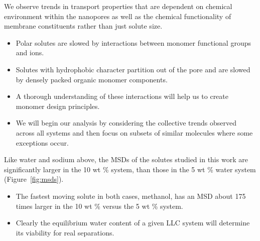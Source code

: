\documentclass{article}
\begin{document}
  We observe trends in transport properties that are dependent on chemical 
  environment within the nanopores as well as the chemical functionality of membrane
  constituents rather than just solute size. 
  \begin{itemize}
    \item Polar solutes are slowed by interactions between monomer functional groups
    and ions.
    \item Solutes with hydrophobic character partition out of the pore and are 
    slowed by densely packed organic monomer components.
    \item A thorough understanding of these interactions will help us to create
    monomer design principles.
    \item We will begin our analysis by considering the collective trends observed  
    across all systems and then focus on subsets of similar molecules where 
    some exceptions occur. 
  \end{itemize}
  
  
  Like water and sodium above, the MSDs of the solutes studied in this work are 
  significantly larger in the 10 wt \% system, than those in the 5 wt \% water 
  system (Figure~\ref{fig:msds}). 
  \begin{itemize}
    \item The fastest moving solute in both cases, methanol, has an MSD about 175
    times larger in the 10 wt \% versus the 5 wt \% system.
    \item Clearly the equilibrium water content of a given LLC system will 
    determine its viability for real separations.
  \end{itemize} 
  
  
\end{document}
